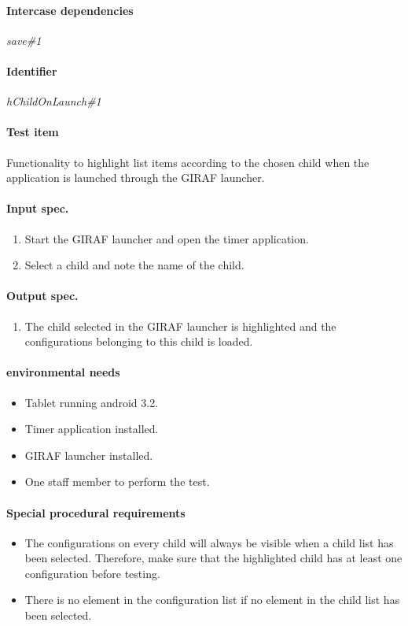 \paragraph{Intercase dependencies}
	\textit{save\#1}

\clearpage
\paragraph{Identifier}
	\textit{hChildOnLaunch\#1}
\paragraph{Test item}
	Functionality to highlight list items according to the chosen child when the application is launched through the GIRAF launcher.
\paragraph{Input spec.}
	\begin{enumerate}
		\item Start the GIRAF launcher and open the timer application.
		\item Select a child and note the name of the child.
	\end{enumerate}
\paragraph{Output spec.}
	\begin{enumerate}
		\item The child selected in the GIRAF launcher is highlighted and the configurations belonging to this child is loaded.
	\end{enumerate}
\paragraph{environmental needs}
	\begin{itemize}
		\item Tablet running android 3.2.
		\item Timer application installed.
		\item GIRAF launcher installed.
		\item One staff member to perform the test.
	\end{itemize}
\paragraph{Special procedural requirements}
	\begin{itemize}
		\item The configurations on every child will always be visible when a child list has been selected. Therefore, make sure that the highlighted child has at least one configuration before testing.
		\item There is no element in the configuration list if no element in the child list has been selected.
	\end{itemize}

